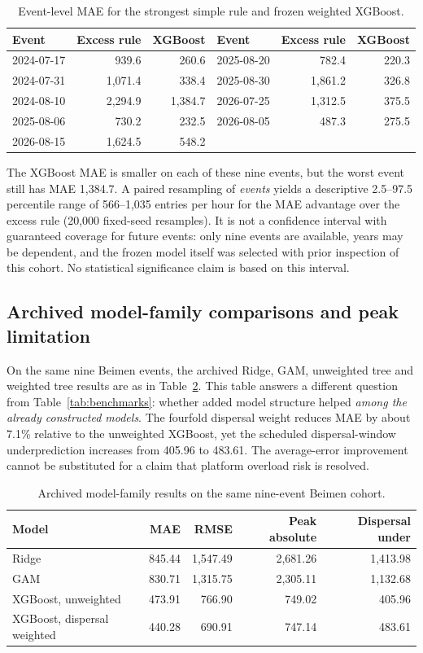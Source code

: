 \begin{table}[htbp]\centering\small
\caption{Event-level MAE for the strongest simple rule and frozen weighted XGBoost.}
\label{tab:eventmae}
\begin{tabular}{lrr@{\qquad}lrr}\toprule
Event & Excess rule & XGBoost & Event & Excess rule & XGBoost\\\midrule
2024-07-17 & 939.6 & 260.6 & 2025-08-20 & 782.4 & 220.3\\
2024-07-31 & 1,071.4 & 338.4 & 2025-08-30 & 1,861.2 & 326.8\\
2024-08-10 & 2,294.9 & 1,384.7 & 2026-07-25 & 1,312.5 & 375.5\\
2025-08-06 & 730.2 & 232.5 & 2026-08-05 & 487.3 & 275.5\\
2026-08-15 & 1,624.5 & 548.2 & & &\\\bottomrule
\end{tabular}
\end{table}
The XGBoost MAE is smaller on each of these nine events, but the worst event still has MAE 1,384.7. A paired resampling of \emph{events} yields a descriptive 2.5--97.5 percentile range of 566--1,035 entries per hour for the MAE advantage over the excess rule (20,000 fixed-seed resamples). It is not a confidence interval with guaranteed coverage for future events: only nine events are available, years may be dependent, and the frozen model itself was selected with prior inspection of this cohort. No statistical significance claim is based on this interval.

\subsection{Archived model-family comparisons and peak limitation}
On the same nine Beimen events, the archived Ridge, GAM, unweighted tree and weighted tree results are as in Table~\ref{tab:modelcompare}. This table answers a different question from Table~\ref{tab:benchmarks}: whether added model structure helped \emph{among the already constructed models}. The fourfold dispersal weight reduces MAE by about 7.1\% relative to the unweighted XGBoost, yet the scheduled dispersal-window underprediction increases from 405.96 to 483.61. The average-error improvement cannot be substituted for a claim that platform overload risk is resolved.
\begin{table}[htbp]\centering\small
\caption{Archived model-family results on the same nine-event Beimen cohort.}
\label{tab:modelcompare}
\begin{tabular}{lrrrr}\toprule
Model & MAE & RMSE & Peak absolute & Dispersal under\\\midrule
Ridge & 845.44 & 1,547.49 & 2,681.26 & 1,413.98\\
GAM & 830.71 & 1,315.75 & 2,305.11 & 1,132.68\\
XGBoost, unweighted & 473.91 & 766.90 & 749.02 & 405.96\\
XGBoost, dispersal weighted & 440.28 & 690.91 & 747.14 & 483.61\\\bottomrule
\end{tabular}
\end{table}

